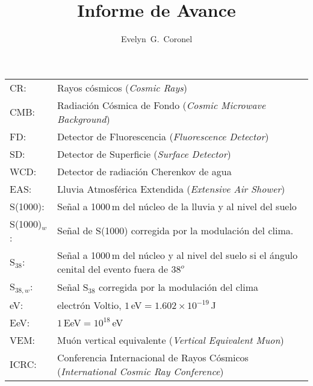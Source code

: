 \documentclass{ibtesis}
\title{Informe de Avance}
\author{Evelyn~G.~Coronel}
\begin{document}
\begin{preliminary}


\begin{abreviaturas}

\begin{tabular}{l l}
CR: 		& Rayos cósmicos  (\emph{Cosmic Rays}) \\
CMB: 		& Radiación Cósmica de Fondo (\emph{Cosmic Microwave Background})\\
FD: 		& Detector de Fluorescencia (\emph{Fluorescence Detector}) \\
SD: 		& Detector de Superficie (\emph{Surface Detector})  \\
WCD: 		& Detector de radiación Cherenkov de agua\\
EAS: 		& Lluvia Atmosférica Extendida  (\emph{Extensive Air Shower})    \\
S(1000): 	& Señal a 1000\,m del núcleo de la lluvia y al nivel del suelo \\
S(1000)$_w$:& Señal de S(1000) corregida por la modulación del clima. \\
S$_{38}$: 	& Señal a 1000\,m del núcleo y al nivel del suelo si el ángulo cenital del evento fuera de $38^o$\\
S$_{38,w}$: & Señal S$_{38}$ corregida por la modulación del clima \\
eV: 		& electrón Voltio, $1\,$eV$= 1.602\times 10^{-19}\,$J \\
EeV: 		& $1\,$EeV$=10^{18}\,$eV\\
VEM: 		& Muón vertical equivalente (\emph{Vertical Equivalent Muon})\\
ICRC: 		& Conferencia Internacional de Rayos Cósmicos (\emph{International Cosmic Ray Conference})\\
\end{tabular}
\end{abreviaturas}

	\tableofcontents                %
	\listoffigures                  %


\end{preliminary}
\end{document}
